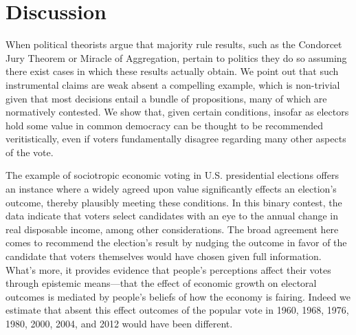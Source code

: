 \documentclass[11pt]{article}
\begin{document}
\section{Discussion}

When political  theorists argue that majority rule results, such as the Condorcet Jury Theorem or Miracle of Aggregation, pertain to politics they do so assuming there exist cases in which these results actually obtain. We point out that such instrumental claims are weak absent a compelling example, which is non-trivial given that most decisions entail a bundle of propositions, many of which are normatively contested. We show that, given certain conditions, insofar as electors hold some value in common democracy can be thought to be recommended veritistically, even if voters fundamentally disagree regarding many other aspects of the vote.

The example of sociotropic economic voting in U.S. presidential elections offers an instance where a widely agreed upon value significantly effects an election's outcome, thereby plausibly meeting these conditions. In this binary contest, the data indicate that voters select candidates with an eye to the annual change in real disposable income, among other considerations. The broad agreement here comes to recommend the election's result by nudging the outcome in favor of the candidate that voters themselves would have chosen given full information. What's more, it provides evidence that people's perceptions affect their votes through epistemic means---that the effect of economic growth on electoral outcomes is mediated by people's beliefs of how the economy is fairing. Indeed we estimate that absent this effect outcomes of the popular vote in 1960, 1968, 1976, 1980, 2000, 2004, and 2012 would have been different.
\end{document}
